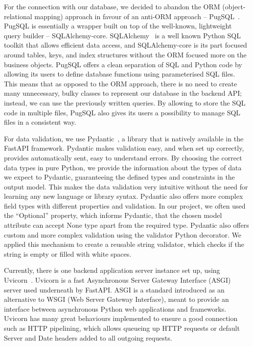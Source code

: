 
For the connection with our database, we decided to abandon the ORM (object-relational mapping) approach in favour of an anti-ORM approach -- PugSQL~\cite{pugsql}. PugSQL is essentially a wrapper built on top of the well-known, lightweight query builder -- SQLAlchemy-core. SQLAlchemy~\cite{sqlalchemy} is a well known Python SQL toolkit that allows efficient data access, and SQLAlchemy-core is its part focused around tables, keys, and index structures without the ORM focused more on the business objects. PugSQL offers a clean separation of SQL and Python code by allowing its users to define database functions using parameterised SQL files. This means that as opposed to the ORM approach, there is no need to create many unnecessary, bulky classes to represent our database in the backend API; instead, we can use the previously written queries. By allowing to store the SQL code in multiple files, PugSQL also gives its users a possibility to manage SQL files in a consistent way. 



For data validation, we use Pydantic~\cite{pydantic}, a library that is natively available in the FastAPI framework. Pydantic makes validation easy, and when set up correctly, provides automatically sent, easy to understand errors. By choosing the correct data types in pure Python, we provide the information about the types of data we expect to Pydantic, guaranteeing the defined types and constraints in the output model. This makes the data validation very intuitive without the need for learning any new language or library syntax. Pydantic also offers more complex field types with different properties and validation. In our project, we often used the ``Optional'' property, which informs Pydantic, that the chosen model attribute can accept None type apart from the required type. Pydantic also offers custom and more complex validation using the validator Python decorator. We applied this mechanism to create a reusable string validator, which checks if the string is empty or filled with white spaces.


Currently, there is one backend application server instance set up, using Uvicorn~\cite{uvicorn}. Uvicorn is a fast Asynchronous Server Gateway Interface (ASGI) server used underneath by FastAPI. ASGI is a standard introduced as an alternative to WSGI (Web Server Gateway Interface), meant to provide an interface between asynchronous Python web applications and frameworks. Uvicorn has many great behaviours implemented to ensure a good connection such as HTTP pipelining, which allows queueing up HTTP requests or default Server and Date headers added to all outgoing requests. 

